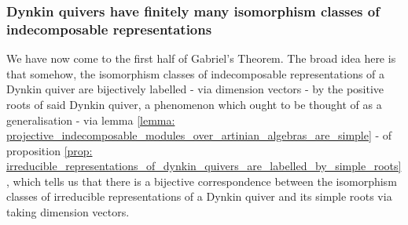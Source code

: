         \subsubsection{Dynkin quivers have finitely many isomorphism classes of indecomposable representations}
            We have now come to the first half of Gabriel's Theorem. The broad idea here is that somehow, the isomorphism classes of indecomposable representations of a Dynkin quiver are bijectively labelled - via dimension vectors - by the positive roots of said Dynkin quiver, a phenomenon which ought to be thought of as a generalisation - via lemma \ref{lemma: projective_indecomposable_modules_over_artinian_algebras_are_simple} - of proposition \ref{prop: irreducible_representations_of_dynkin_quivers_are_labelled_by_simple_roots}, which tells us that there is a bijective correspondence between the isomorphism classes of irreducible representations of a Dynkin quiver and its simple roots via taking dimension vectors. 
            
